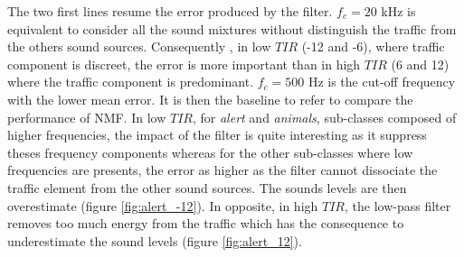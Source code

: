 \documentclass[twocolumn,a4paper,10pt]{article}
\begin{document}
The two first lines resume the error produced by the filter. $f_c = 20 $ kHz is equivalent to consider all the sound mixtures without distinguish the traffic from the others sound sources. Consequently , in low $TIR$ (-12 and -6), where traffic component is discreet, the error is more important than in high $TIR$ (6 and 12) where the traffic component is predominant. $f_c = 500$ Hz is the cut-off frequency with the lower mean error. It is then the baseline to refer to compare the performance of NMF. In low $TIR$, for \textit{alert} and \textit{animals}, sub-classes composed of higher frequencies, the impact of the filter is quite interesting as it suppress theses frequency components whereas for the other sub-classes where low frequencies are presents, the error as higher as the filter cannot dissociate the traffic element from the other sound sources. The sounds levels are then overestimate (figure \ref{fig:alert_-12}). In opposite, in high $TIR$, the low-pass filter removes too much energy from the traffic which has the consequence to underestimate the sound levels (figure \ref{fig:alert_12}).\\
\end{document}
